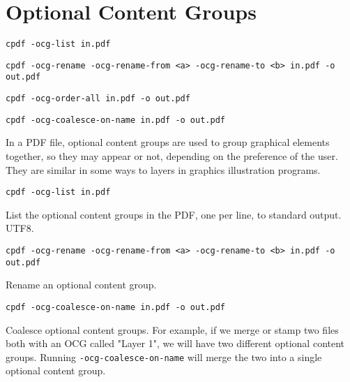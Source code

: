 \documentclass{book}
\begin{document}
\clearpage\pagestyle{empty}
\chapter{Optional Content Groups}\label{chap:16}\pagestyle{fancy}

  {\small\begin{framed}
  \noindent\verb!cpdf -ocg-list in.pdf!

  \vspace{1.5mm}
  \noindent\verb!cpdf -ocg-rename -ocg-rename-from <a> -ocg-rename-to <b> in.pdf -o out.pdf!

  \vspace{1.5mm}
  \noindent\verb!cpdf -ocg-order-all in.pdf -o out.pdf!

  \vspace{1.5mm}
  \noindent\verb!cpdf -ocg-coalesce-on-name in.pdf -o out.pdf!

  \end{framed}}


In a PDF file, optional content groups are used to group graphical elements together, so they may appear or not, depending on the preference of the user. They are similar in some ways to layers in graphics illustration programs.

  {\small\begin{framed}
  \noindent\verb!cpdf -ocg-list in.pdf!
  \end{framed}}

\noindent List the optional content groups in the PDF, one per line, to standard output. UTF8.
  
  {\small\begin{framed}
  \noindent\verb!cpdf -ocg-rename -ocg-rename-from <a> -ocg-rename-to <b> in.pdf -o out.pdf!
  \end{framed}}

\noindent Rename an optional content group.



  {\small\begin{framed}
  \noindent\verb!cpdf -ocg-coalesce-on-name in.pdf -o out.pdf!
  \end{framed}}


\noindent Coalesce optional content groups. For example, if we merge or stamp two files both with an OCG called "Layer 1", we will have two different optional content groups. Running \texttt{-ocg-coalesce-on-name} will merge the two into a single optional content group.
\end{document}
